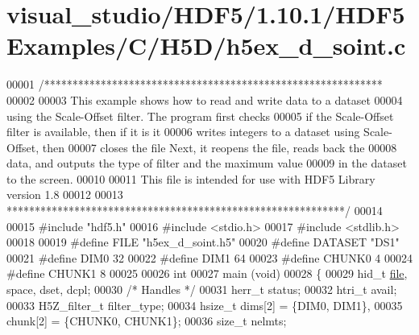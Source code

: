 \hypertarget{visual__studio_2_h_d_f5_21_810_81_2_h_d_f5_examples_2_c_2_h5_d_2h5ex__d__soint_8c_source}{}\section{visual\+\_\+studio/\+H\+D\+F5/1.10.1/\+H\+D\+F5\+Examples/\+C/\+H5\+D/h5ex\+\_\+d\+\_\+soint.c}
\label{visual__studio_2_h_d_f5_21_810_81_2_h_d_f5_examples_2_c_2_h5_d_2h5ex__d__soint_8c_source}

\begin{DoxyCode}
00001 \textcolor{comment}{/************************************************************}
00002 \textcolor{comment}{}
00003 \textcolor{comment}{  This example shows how to read and write data to a dataset}
00004 \textcolor{comment}{  using the Scale-Offset filter.  The program first checks}
00005 \textcolor{comment}{  if the Scale-Offset filter is available, then if it is it}
00006 \textcolor{comment}{  writes integers to a dataset using Scale-Offset, then}
00007 \textcolor{comment}{  closes the file Next, it reopens the file, reads back the}
00008 \textcolor{comment}{  data, and outputs the type of filter and the maximum value}
00009 \textcolor{comment}{  in the dataset to the screen.}
00010 \textcolor{comment}{}
00011 \textcolor{comment}{  This file is intended for use with HDF5 Library version 1.8}
00012 \textcolor{comment}{}
00013 \textcolor{comment}{ ************************************************************/}
00014 
00015 \textcolor{preprocessor}{#include "hdf5.h"}
00016 \textcolor{preprocessor}{#include <stdio.h>}
00017 \textcolor{preprocessor}{#include <stdlib.h>}
00018 
00019 \textcolor{preprocessor}{#define FILE            "h5ex\_d\_soint.h5"}
00020 \textcolor{preprocessor}{#define DATASET         "DS1"}
00021 \textcolor{preprocessor}{#define DIM0            32}
00022 \textcolor{preprocessor}{#define DIM1            64}
00023 \textcolor{preprocessor}{#define CHUNK0          4}
00024 \textcolor{preprocessor}{#define CHUNK1          8}
00025 
00026 \textcolor{keywordtype}{int}
00027 main (\textcolor{keywordtype}{void})
00028 \{
00029     hid\_t           \hyperlink{structfile}{file}, space, dset, dcpl;
00030                                                 \textcolor{comment}{/* Handles */}
00031     herr\_t          status;
00032     htri\_t          avail;
00033     H5Z\_filter\_t    filter\_type;
00034     hsize\_t         dims[2] = \{DIM0, DIM1\},
00035                     chunk[2] = \{CHUNK0, CHUNK1\};
00036     \textcolor{keywordtype}{size\_t}          nelmts;

\end{DoxyCode}

